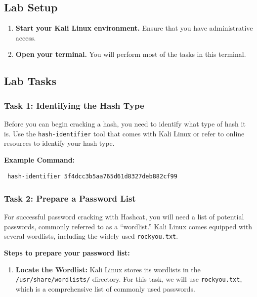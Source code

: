 \documentclass[11pt,a4paper]{article}
\providecommand{\tightlist}{%
  \setlength{\itemsep}{0pt}\setlength{\parskip}{0pt}}
\begin{document}
\subsection{Lab Setup}\label{lab-setup}

\begin{enumerate}
\def\labelenumi{\arabic{enumi}.}
\item
  \textbf{Start your Kali Linux environment.} Ensure that you have
  administrative access.
\item
  \textbf{Open your terminal.} You will perform most of the tasks in
  this terminal.
\end{enumerate}

\subsection{Lab Tasks}\label{lab-tasks}

\subsubsection{Task 1: Identifying the Hash
Type}\label{task-1-identifying-the-hash-type}

Before you can begin cracking a hash, you need to identify what type of
hash it is. Use the \texttt{hash-identifier} tool that comes with Kali
Linux or refer to online resources to identify your hash type.

\textbf{Example Command:}

\begin{verbatim}
 hash-identifier 5f4dcc3b5aa765d61d8327deb882cf99
\end{verbatim}

\subsubsection{Task 2: Prepare a Password
List}\label{task-2-prepare-a-password-list}

For successful password cracking with Hashcat, you will need a list of
potential passwords, commonly referred to as a ``wordlist.'' Kali Linux
comes equipped with several wordlists, including the widely used
\texttt{rockyou.txt}.

\textbf{Steps to prepare your password list:}

\begin{enumerate}
\def\labelenumi{\arabic{enumi}.}
\tightlist
\item
  \textbf{Locate the Wordlist:} Kali Linux stores its wordlists in the
  \texttt{/usr/share/wordlists/} directory. For this task, we will use
  \texttt{rockyou.txt}, which is a comprehensive list of commonly used
  passwords.
\end{enumerate}
\end{document}
